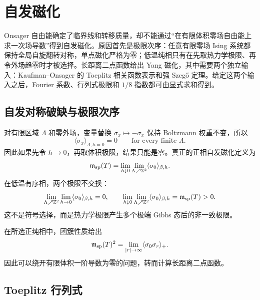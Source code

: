 \section{自发磁化}
\label{chap:phys-sm-yang-magnetization}

Onsager 自由能确定了临界线和转移质量，却不能通过“在有限体积零场自由能上求一次场导数”得到自发磁化。原因首先是极限次序：任意有限零场 Ising 系统都保持全局自旋翻转对称，单点磁化严格为零；低温纯相只有在先取热力学极限、再令外场趋零时才被选择。长距离二点函数给出 Yang 磁化，其中需要两个独立输入：Kaufman--Onsager 的 Toeplitz 相关函数表示和强 Szegő 定理。给定这两个输入之后，Fourier 系数、行列式极限和 \(1/8\) 指数都可由显式求和得到。
\subsection{自发对称破缺与极限次序}

对有限区域 \(\Lambda\) 和零外场，变量替换 \(\sigma_x\mapsto-\sigma_x\) 保持 Boltzmann 权重不变，所以
\begin{equation}
 \langle\sigma_x\rangle_{\Lambda,h=0}=0
 \qquad\text{for every finite }\Lambda.
 \label{eq:phys-sm-finite-zero-field-magnetization}
\end{equation}
因此如果先令 \(h\to0\)，再取体积极限，结果只能是零。真正的正相自发磁化定义为
\begin{equation}
 \mathfrak m_{\rm sp}(T)
 =\lim_{h\downarrow0}
 \lim_{\Lambda\nearrow\mathbb Z^2}
 \langle\sigma_0\rangle_{\beta,h}.
 \label{eq:phys-sm-yang-m-definition}
\end{equation}
在低温有序相，两个极限不交换：
\begin{equation}
 \lim_{\Lambda\nearrow\mathbb Z^2}
 \lim_{h\to0}\langle\sigma_0\rangle_{\beta,h}=0,
 \qquad
 \lim_{h\downarrow0}
 \lim_{\Lambda\nearrow\mathbb Z^2}
 \langle\sigma_0\rangle_{\beta,h}=\mathfrak m_{\rm sp}(T)>0.
 \label{eq:phys-sm-symmetry-breaking-order-limits}
\end{equation}
这不是符号选择，而是热力学极限产生多个极端 Gibbs 态后的非一致极限。

在所选正纯相中，团簇性质给出
\begin{equation}
 \mathfrak m_{\rm sp}(T)^2
 =\lim_{|r|\to\infty}
 \langle\sigma_0\sigma_r\rangle_{+}.
 \label{eq:phys-sm-yang-correlation-limit}
\end{equation}
因此可以绕开有限体积一阶导数为零的问题，转而计算长距离二点函数。

\subsection{Toeplitz 行列式}

